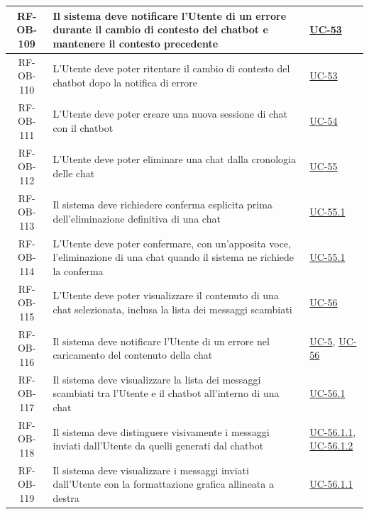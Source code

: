 \documentclass[a4paper,12pt]{article}
\begin{document}
\begin{center}
\begin{longtable}{|c|p{8.5cm}|>{\centering\arraybackslash}p{4cm}|}
RF-OB-109 & Il sistema deve notificare l'Utente di un errore durante il cambio di contesto del chatbot e mantenere il contesto precedente & \hyperref[sec:UC-53]{UC-53} \\
\hline

RF-OB-110 & L'Utente deve poter ritentare il cambio di contesto del chatbot dopo la notifica di errore & \hyperref[sec:UC-53]{UC-53} \\
\hline

RF-OB-111 & L'Utente deve poter creare una nuova sessione di chat con il chatbot & \hyperref[subsec:UC-54]{UC-54} \\
\hline

RF-OB-112 & L'Utente deve poter eliminare una chat dalla cronologia delle chat & \hyperref[subsec:UC-55]{UC-55} \\
\hline

RF-OB-113 & Il sistema deve richiedere conferma esplicita prima dell'eliminazione definitiva di una chat & \hyperref[subsec:UC-55.1]{UC-55.1} \\
\hline

RF-OB-114 & L'Utente deve poter confermare, con un'apposita voce, l'eliminazione di una chat quando il sistema ne richiede la conferma & \hyperref[subsec:UC-55.1]{UC-55.1} \\
\hline

RF-OB-115 & L'Utente deve poter visualizzare il contenuto di una chat selezionata, inclusa la lista dei messaggi scambiati & \hyperref[subsec:UC-56]{UC-56} \\
\hline

RF-OB-116 & Il sistema deve notificare l'Utente di un errore nel caricamento del contenuto della chat & \hyperref[sec:UC-5]{UC-5}, \hyperref[subsec:UC-56]{UC-56} \\
\hline

RF-OB-117 & Il sistema deve visualizzare la lista dei messaggi scambiati tra l'Utente e il chatbot all'interno di una chat & \hyperref[subsec:UC-56.1]{UC-56.1} \\
\hline

RF-OB-118 & Il sistema deve distinguere visivamente i messaggi inviati dall'Utente da quelli generati dal chatbot & \hyperref[subsec:UC-56.1.1]{UC-56.1.1}, \hyperref[subsec:UC-56.1.2]{UC-56.1.2} \\
\hline

RF-OB-119 & Il sistema deve visualizzare i messaggi inviati dall'Utente con la formattazione grafica allineata a destra & \hyperref[subsec:UC-56.1.1]{UC-56.1.1} \\
\hline


\end{longtable}
\end{center}
\end{document}

